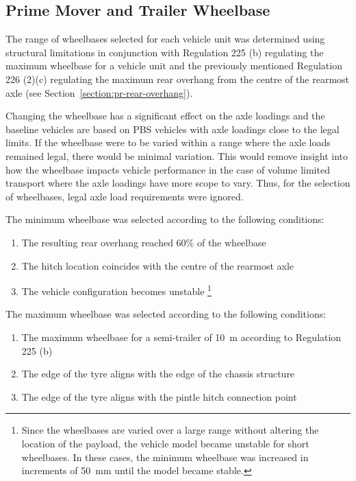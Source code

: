 \subsection{Prime Mover and Trailer Wheelbase}\label{section:pr-wheelbase}

The range of wheelbases selected for each vehicle unit was determined using structural limitations in conjunction with Regulation 225 (b) regulating the maximum wheelbase for a vehicle unit and the previously mentioned Regulation 226 (2)(c) regulating the maximum rear overhang from the centre of the rearmost axle (see Section~\ref{section:pr-rear-overhang}).

Changing the wheelbase has a significant effect on the axle loadings and the baseline vehicles are based on PBS vehicles with axle loadings close to the legal limits. If the wheelbase were to be varied within a range where the axle loads remained legal, there would be minimal variation. This would remove insight into how the wheelbase impacts vehicle performance in the case of volume limited transport where the axle loadings have more scope to vary. Thus, for the selection of wheelbases, legal axle load requirements were ignored.

The minimum wheelbase was selected according to the following conditions:

\begin{enumerate}
	\item The resulting rear overhang reached 60\% of the wheelbase
	\item The hitch location coincides with the centre of the rearmost axle
	\item The vehicle configuration becomes unstable \footnote{Since the wheelbases are varied over a large range without altering the location of the payload, the vehicle model became unstable for short wheelbases. In these cases, the minimum wheelbase was increased in increments of 50~mm until the model became stable.}
\end{enumerate}

The maximum wheelbase was selected according to the following conditions:

\begin{enumerate}
	\item The maximum wheelbase for a semi-trailer of 10~m according to Regulation 225 (b)
	\item The edge of the tyre aligns with the edge of the chassis structure
	\item The edge of the tyre aligns with the pintle hitch connection point
\end{enumerate}

